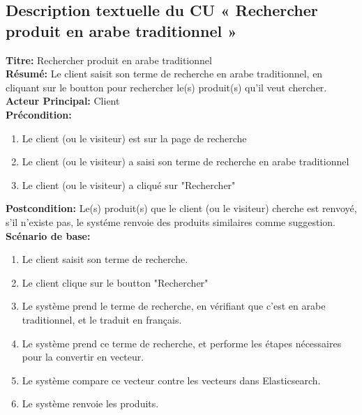 \subsection{Description textuelle du CU « Rechercher produit en arabe traditionnel »}
\noindent
\textbf{Titre:} Rechercher produit en arabe traditionnel \\
\textbf{Résumé:} Le client saisit son terme de recherche en arabe traditionnel, en cliquant sur le boutton pour rechercher le(s) produit(s) qu'il veut chercher. \\
\textbf{Acteur Principal:} Client \\
\textbf{Précondition:} \begin{enumerate}
	\item Le client (ou le visiteur) est sur la page de recherche
	\item Le client (ou le visiteur) a saisi son terme de recherche en arabe traditionnel
	\item Le client (ou le visiteur) a cliqué sur "Rechercher"
\end{enumerate}
\textbf{Postcondition:} Le(s) produit(s) que le client (ou le visiteur) cherche est renvoyé, s'il n'existe pas, le systéme renvoie des produits similaires comme suggestion. \\
\textbf{Scénario de base: }
\begin{enumerate}
	\item Le client saisit son terme de recherche.
	\item Le client clique sur le boutton "Rechercher"
	\item Le système prend le terme de recherche, en vérifiant que c'est en arabe traditionnel, et le traduit en français.
	\item Le système prend ce terme de recherche, et performe les étapes nécessaires pour la convertir en vecteur.
	\item Le système compare ce vecteur contre les vecteurs dans Elasticsearch.
	\item Le système renvoie les produits.
\end{enumerate}

